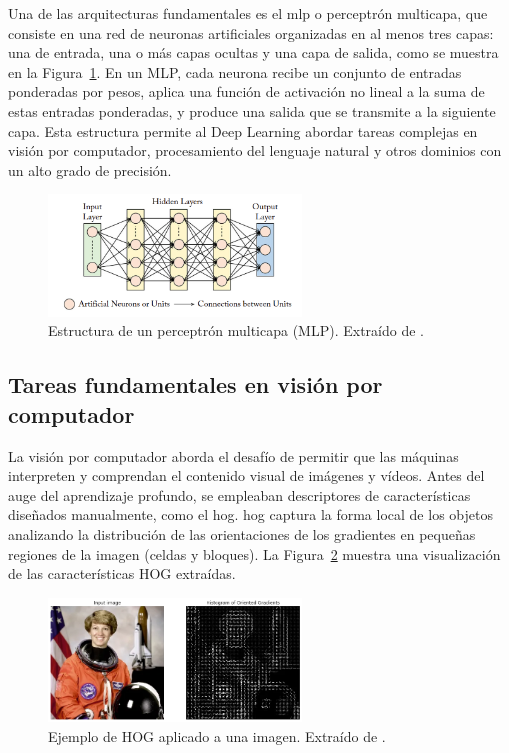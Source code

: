 \documentclass[11pt,spanish,listoffigures,listoftables]{tfgetsinf}
\begin{document}
Una de las arquitecturas fundamentales es el \gls{mlp} o perceptrón multicapa, que consiste en una red de neuronas artificiales organizadas en al menos tres capas: una de entrada, una o más capas ocultas y una capa de salida, como se muestra en la Figura~\ref{fig:multilayer_perceptron}. En un MLP, cada neurona recibe un conjunto de entradas ponderadas por pesos, aplica una función de activación no lineal a la suma de estas entradas ponderadas, y produce una salida que se transmite a la siguiente capa. Esta estructura permite al Deep Learning abordar tareas complejas en visión por computador, procesamiento del lenguaje natural y otros dominios con un alto grado de precisión.


\begin{figure}[H]
   \centering
   \includegraphics[width=0.6\textwidth]{images/estado_del_arte/multilayer_perceptron.png}
      \caption[Estructura de un perceptrón multicapa (MLP)]{Estructura de un perceptrón multicapa (MLP). Extraído de \cite[fig. 3.1, p.~32]{khan2018guide}.}
   \label{fig:multilayer_perceptron}
\end{figure}

\subsection{Tareas fundamentales en visión por computador} \label{sec:tareas_fundamentales_vision_por_computador}

La visión por computador aborda el desafío de permitir que las máquinas interpreten y comprendan el contenido visual de imágenes y vídeos. Antes del auge del aprendizaje profundo, se empleaban descriptores de características diseñados manualmente, como el \gls{hog}. \gls{hog} captura la forma local de los objetos analizando la distribución de las orientaciones de los gradientes en pequeñas regiones de la imagen (celdas y bloques). La Figura~\ref{fig:hog} muestra una visualización de las características HOG extraídas. 

\begin{figure}[H]
   \centering
   \includegraphics[width=0.6\textwidth]{images/estado_del_arte/HOG_example.png}
   \caption[Ejemplo de HOG aplicado a una imagen]{Ejemplo de HOG aplicado a una imagen. Extraído de \cite{opengenusHOG}.}
   \label{fig:hog}
\end{figure}
\end{document}
